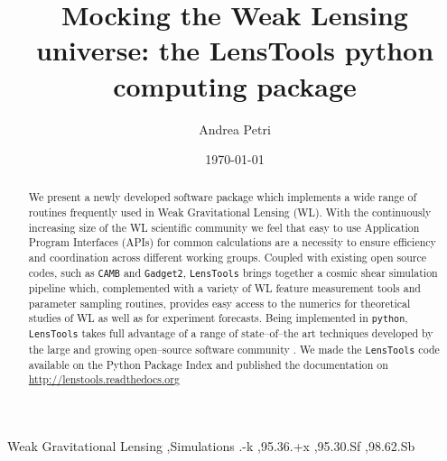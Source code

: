 \documentclass[5p]{elsarticle}
\newcommand{\ttt}[1]{\texttt{#1}}
\newcommand{\LT}{\texttt{LensTools} }
\begin{document}
\title{Mocking the Weak Lensing universe: the LensTools python computing package}

\author[cu,bnl]{Andrea Petri}

\address[cu]{Department of Physics, Columbia University, New York, NY 10027, USA}
\address[bnl]{Physics Department, Brookhaven National Laboratory, Upton, NY 11973, USA}

\date{\today}

\label{firstpage}

\begin{abstract}
We present a newly developed software package which implements a wide range of routines frequently used in Weak Gravitational Lensing (WL). With the continuously increasing size of the WL scientific community we feel that easy to use Application Program Interfaces (APIs) for common calculations are a necessity to ensure efficiency and coordination across different working groups. Coupled with existing open source codes, such as \ttt{CAMB}\citep{CAMB} and \ttt{Gadget2}\citep{Gadget2}, \LT brings together a cosmic shear simulation pipeline which, complemented with a variety of WL feature measurement tools and parameter sampling routines, provides easy access to the numerics for theoretical studies of WL as well as for experiment forecasts. Being implemented in \ttt{python}\citep{python}, \LT takes full advantage of a range of state--of--the art techniques developed by the large and growing open--source software community \citep{scipy,pandas,astropy,scikit-learn,emcee}. We made the \LT code available on the Python Package Index and published the documentation on \url{http://lenstools.readthedocs.org}      
    
\end{abstract}

\begin{keyword}
Weak Gravitational Lensing \sep Simulations
.-k \sep 95.36.+x \sep 95.30.Sf \sep 98.62.Sb
\end{keyword}

\maketitle


\end{document}
